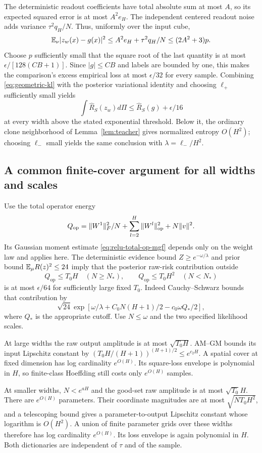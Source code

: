 The deterministic readout coefficients have total absolute sum at most $A$, so its expected squared error is at most $A^2e_H$. The independent centered readout noise adds variance $\tau^2q_H/N$. Thus, uniformly over the input cube,
\begin{equation}
 \mathbb E_\nu|z_w(x)-g(x)|^2
 \le A^2e_H+\tau^2q_H/N
 \le(2A^2+3)p.
 \label{eq:geometric-output-error}
\end{equation}
Choose $p$ sufficiently small that the square root of the last quantity is at most $\epsilon/[128(CB+1)]$. Since $|g|\le CB$ and labels are bounded by one, this makes the comparison's excess empirical loss at most $\epsilon/32$ for every sample. Combining \eqref{eq:geometric-kl} with the posterior variational identity and choosing $\ell_+$ sufficiently small yields
\[
 \int\widehat R_S(z_w)d\Pi\le\widehat R_S(g)+\epsilon/16
\]
at every width above the stated exponential threshold. Below it, the ordinary clone neighborhood of Lemma~\ref{lem:teacher} gives normalized entropy $O(H^2)$; choosing $\ell_-$ small yields the same conclusion with $\lambda=\ell_-/H^2$.

\subsection{A common finite-cover argument for all widths and scales}
Use the total operator energy
\[
 Q_{\mathrm{op}}=\|W^1\|_F^2/N+
       \sum_{l=2}^H\|W^l\|_{\mathrm{op}}^2+N\|v\|^2.
\]
Its Gaussian moment estimate \eqref{eq:relu-total-op-mgf} depends only on the weight law and applies here. The deterministic evidence bound $Z\ge e^{-\omega/\lambda}$ and prior bound $\mathbb E_\mu R(z)^2\le24$ imply that the posterior raw-risk contribution outside
\[
 Q_{\mathrm{op}}\le T_0H\quad(N\ge N_*),\qquad
 Q_{\mathrm{op}}\le T_0H^2\quad(N<N_*)
\]
is at most $\epsilon/64$ for sufficiently large fixed $T_0$. Indeed Cauchy--Schwarz bounds that contribution by
\[
 \sqrt{24}\exp[\omega/\lambda+C_0N(H+1)/2-c_0\omega Q_*/2],
\]
where $Q_*$ is the appropriate cutoff. Use $N\le\omega$ and the two specified likelihood scales.

At large widths the raw output amplitude is at most $\sqrt{T_0H}$. AM--GM bounds its input Lipschitz constant by
$(T_0H/(H+1))^{(H+1)/2}\le e^{c_2H}$. A spatial cover at fixed dimension has log cardinality $e^{O(H)}$. Its square-loss envelope is polynomial in $H$, so finite-class Hoeffding still costs only $e^{O(H)}$ samples.

At smaller widths, $N<e^{aH}$ and the good-set raw amplitude is at most $\sqrt{T_0}H$. There are $e^{O(H)}$ parameters. Their coordinate magnitudes are at most $\sqrt{NT_0H^2}$, and a telescoping bound gives a parameter-to-output Lipschitz constant whose logarithm is $O(H^2)$. A union of finite parameter grids over these widths therefore has log cardinality $e^{O(H)}$. Its loss envelope is again polynomial in $H$. Both dictionaries are independent of $\tau$ and of the sample.

